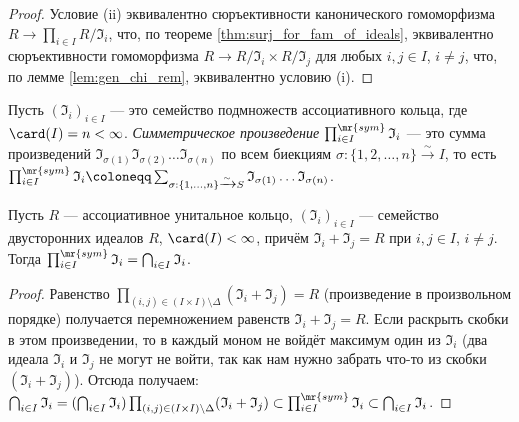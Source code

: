 \documentclass[
	extrafontsizes,
	11pt,
	hyphens,
]{memoir}
\begin{document}
\begin{proof}
Условие (ii) эквивалентно сюръективности канонического гомоморфизма $R \to \prod_{i \in I} R/\mathfrak{I}_i$, что, по теореме \ref{thm:surj_for_fam_of_ideals}, эквивалентно сюръективности гомоморфизма $R \to R/\mathfrak{I}_i \times R/\mathfrak{I}_j$ для любых $i,j \in I$, $i \neq j$, что, по лемме \ref{lem:gen_chi_rem}, эквивалентно условию (i).
\end{proof}

\begin{definition}
Пусть $(\mathfrak{I}_i)_{i \in I}$ --- это семейство подмножеств ассоциативного кольца, где
$\card(I) = n < \infty$.
\emph{Симметрическое произведение} $\prod^{\mr{sym}}_{i \in I} \mathfrak{I}_i$ --- это сумма произведений
$\mathfrak{I}_{\sigma(1)} \mathfrak{I}_{\sigma(2)} \dots \mathfrak{I}_{\sigma(n)}$
по всем биекциям
$\sigma : \{1, 2, \dots, n\} \xrightarrow{\sim} I$,
то есть
\(
\prod^{\mr{sym}}_{i \in I} \mathfrak{I}_i
\coloneqq
\sum_{\sigma : \{1, \dots{}, n\} \xrightarrow{\sim} S}
\mathfrak{I}_{\sigma(1)} \dots \mathfrak{I}_{\sigma(n)}
\).
\end{definition}

\begin{theorem}
Пусть $R$ --- ассоциативное унитальное кольцо,
$(\mathfrak{I}_i)_{i \in I}$ --- семейство двусторонних идеалов $R$,
$\card(I) < \infty$, причём $\mathfrak{I}_i + \mathfrak{I}_j = R$ при $i,j \in I$, $i \neq j$.
Тогда $\prod^{\mr{sym}}_{i \in I} \mathfrak{I}_i = \bigcap_{i \in I} \mathfrak{I}_i$.
\end{theorem}

\begin{proof}
Равенство $\prod_{(i,j) \in (I \times I) \setminus \Delta} (\mathfrak{I}_i + \mathfrak{I}_j) = R$ (произведение в произвольном порядке) получается перемножением равенств $\mathfrak{I}_i + \mathfrak{I}_j = R$.
Если раскрыть скобки в этом произведении, то в каждый моном не войдёт максимум один из $\mathfrak{I}_i$ (два идеала $\mathfrak{I}_i$ и $\mathfrak{I}_j$ не могут не войти, так как нам нужно забрать что-то из скобки $(\mathfrak{I}_i + \mathfrak{I}_j)$).
Отсюда получаем:
$
\bigcap_{i \in I} \mathfrak{I}_i
=
(\bigcap_{i \in I} \mathfrak{I}_i)
\prod_{(i,j) \in (I \times I) \setminus \Delta} (\mathfrak{I}_i + \mathfrak{I}_j)
\subset
\prod^{\mr{sym}}_{i \in I} \mathfrak{I}_i
\subset
\bigcap_{i \in I} \mathfrak{I}_i
$.
\end{proof}
\end{document}
